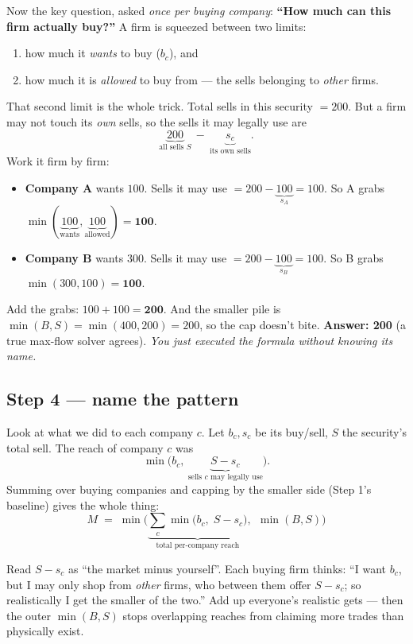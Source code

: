 Now the key question, asked \emph{once per buying company}: \textbf{``How much can
this firm actually buy?''} A firm is squeezed between two limits:
\begin{enumerate}[leftmargin=1.6em,nosep]
  \item how much it \emph{wants} to buy ($b_c$), and
  \item how much it is \emph{allowed} to buy from --- the sells belonging to
        \emph{other} firms.
\end{enumerate}
That second limit is the whole trick. Total sells in this security $=200$. But a
firm may not touch its \emph{own} sells, so the sells it may legally use are
\[
\underbrace{200}_{\text{all sells } S}\ -\ \underbrace{s_c}_{\text{its own sells}}.
\]
Work it firm by firm:
\begin{itemize}[leftmargin=1.4em]
  \item \textbf{Company A} wants $100$. Sells it may use $= 200 - \underbrace{100}_{s_A} = 100$.
        So A grabs $\min(\underbrace{100}_{\text{wants}}, \underbrace{100}_{\text{allowed}}) = \mathbf{100}$.
  \item \textbf{Company B} wants $300$. Sells it may use $= 200 - \underbrace{100}_{s_B} = 100$.
        So B grabs $\min(300, 100) = \mathbf{100}$.
\end{itemize}
Add the grabs: $100 + 100 = \mathbf{200}$. And the smaller pile is
$\min(B,S)=\min(400,200)=200$, so the cap doesn't bite. \textbf{Answer: 200}
(a true max-flow solver agrees). \emph{You just executed the formula without
knowing its name.}

\subsection{Step 4 --- name the pattern}

Look at what we did to each company $c$. Let $b_c,s_c$ be its buy/sell, $S$ the
security's total sell. The reach of company $c$ was
\[
\min\big(b_c,\ \underbrace{S-s_c}_{\text{sells $c$ may legally use}}\big).
\]
Summing over buying companies and capping by the smaller side (Step 1's baseline)
gives the whole thing:
\[
\boxed{\;M \;=\; \min\!\Big(\underbrace{\textstyle\sum_{c}\min\big(b_c,\;S-s_c\big)}_{\text{total per-company reach}},\ \ \min(B,S)\Big)\;}
\]

\begin{intu}
Read $S-s_c$ as ``the market minus yourself''. Each buying firm thinks: ``I want
$b_c$, but I may only shop from \emph{other} firms, who between them offer
$S-s_c$; so realistically I get the smaller of the two.'' Add up everyone's
realistic gets --- then the outer $\min(B,S)$ stops overlapping reaches from
claiming more trades than physically exist.
\end{intu}

